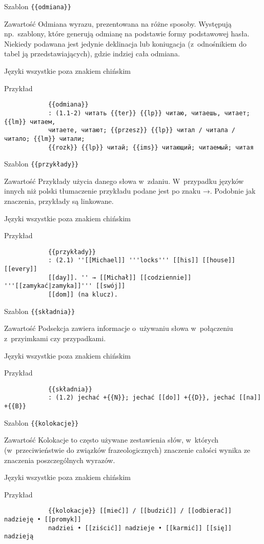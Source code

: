 \spacer
\begin{opis}
	\item[Szablon] \verb|{{odmiana}}|
	\item[Zawartość] Odmiana wyrazu, prezentowana na różne sposoby. Występują np.\ szablony, które generują odmianę na podstawie formy podstawowej hasła. Niekiedy podawana jest jedynie deklinacja lub koniugacja (z~odnośnikiem do tabel ją przedstawiających), gdzie indziej cała odmiana.
	\item[Języki] wszystkie poza znakiem chińskim
	\item[Przykład]
		\begin{verbatim}
			{{odmiana}}
			: (1.1-2) читать {{ter}} {{lp}} читаю, читаешь, читает; {{lm}} читаем,
			читаете, читают; {{przesz}} {{lp}} читал / читала / читало; {{lm}} читали;
			{{rozk}} {{lp}} читай; {{ims}} читающий; читаемый; читая
		\end{verbatim}
\end{opis}
\spacer
\begin{opis}
	\item[Szablon] \verb|{{przykłady}}|
	\item[Zawartość] Przykłady użycia danego słowa w~zdaniu. W~przypadku języków innych niż polski tłumaczenie przykładu podane jest po znaku →. Podobnie jak znaczenia, przykłady są linkowane.
	\item[Języki] wszystkie poza znakiem chińskim
	\item[Przykład]
		\begin{verbatim}
			{{przykłady}}
			: (2.1) ''[[Michael]] '''locks''' [[his]] [[house]] [[every]]
			[[day]]. '' → [[Michał]] [[codziennie]] '''[[zamykać|zamyka]]''' [[swój]]
			[[dom]] (na klucz).
		\end{verbatim}
\end{opis}
\spacer
\begin{opis}
	\item[Szablon] \verb|{{składnia}}|
	\item[Zawartość] Podsekcja zawiera informacje o~używaniu słowa w~połączeniu z~przyimkami czy przypadkami.
	\item[Języki] wszystkie poza znakiem chińskim
	\item[Przykład]
		\begin{verbatim}
			{{składnia}}
			: (1.2) jechać +{{N}}; jechać [[do]] +{{D}}, jechać [[na]] +{{B}}
		\end{verbatim}
\end{opis}
\spacer
\begin{opis}
	\item[Szablon] \verb|{{kolokacje}}|
	\item[Zawartość] Kolokacje to często używane zestawienia słów, w~których (w~przeciwieństwie do związków frazeologicznych) znaczenie całości wynika ze znaczenia poszczególnych wyrazów.
	\item[Języki] wszystkie poza znakiem chińskim
	\item[Przykład]
		\begin{verbatim}
			{{kolokacje}} [[mieć]] / [[budzić]] / [[odbierać]] nadzieję • [[promyk]]
			nadziei • [[ziścić]] nadzieje • [[karmić]] [[się]] nadzieją
		\end{verbatim}
\end{opis}
